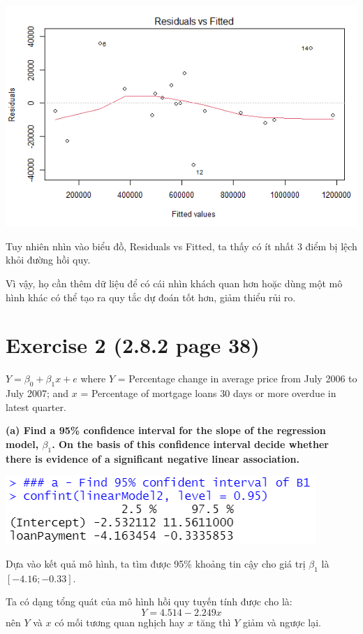 \documentclass[a4paper]{article}
\theoremstyle{nonumberplain}
\begin{document}
\begin{center}
\includegraphics[scale = 0.8]{1d.PNG} 
\end{center}

Tuy nhiên nhìn vào biểu đồ, Residuals vs Fitted, ta thấy có ít nhất 3 điểm bị lệch khỏi đường hồi quy.

Vì vậy, họ cần thêm dữ liệu để có cái nhìn khách quan hơn hoặc dùng một mô hình khác có thể tạo ra quy tắc dự đoán tốt hơn, giảm thiểu rủi ro.

\newpage
\section*{Exercise 2 (2.8.2 page 38)}
$Y = \beta_0 + \beta_1 x + e$ where 
$Y$ = Percentage change in average price from July 2006 to July 2007; and $x$ = Percentage of mortgage loans 30 days or more overdue in latest quarter.

\textbf{(a) Find a 95\% confidence interval for the slope of the regression model, $\beta_1$. On the basis of this confidence interval decide whether there is evidence of a significant negative linear association.}
\begin{center}
\includegraphics[scale = 0.8]{2a.PNG} 
\end{center}
Dựa vào kết quả mô hình, ta tìm được 95\% khoảng tin cậy cho giá trị $\beta_1$ là   $[-4.16;-0.33]$.

Ta có dạng tổng quát của mô hình hồi quy tuyến tính được cho là: $$Y = 4.514 - 2.249x$$ nên $Y$ và $x$ có mối tương quan nghịch hay $x$ tăng thì $Y$ giảm và ngược lại.
\end{document}
